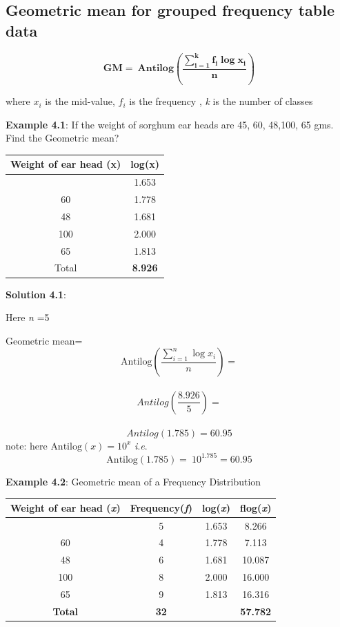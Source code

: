 \documentclass[
]{book}
\begin{document}
\hypertarget{geometric-mean-for-grouped-frequency-table-data}{%
\subsection{Geometric mean for grouped frequency table data}\label{geometric-mean-for-grouped-frequency-table-data}}

\[\mathbf{GM = \ Antilog}\left( \frac{\sum_{\mathbf{i = 1}}^{\mathbf{k}}{{\mathbf{f}_{\mathbf{i}}\mathbf{\log}}\mathbf{x}_{\mathbf{i}}}}{\mathbf{n}} \right)\]

where \(x_{i}\) is the mid-value, \(f_{i}\) is the frequency , \emph{k} is the
number of classes

\textbf{Example 4.1}: If the weight of sorghum ear heads are 45, 60, 48,100,
65 gms. Find the Geometric mean?

\begin{longtable}[]{@{}cc@{}}
\toprule\noalign{}
Weight of ear head (x) & log(x) \\
\midrule\noalign{}
\endhead
\bottomrule\noalign{}
\endlastfoot
45 & 1.653 \\
60 & 1.778 \\
48 & 1.681 \\
100 & 2.000 \\
65 & 1.813 \\
Total & \textbf{8.926} \\
\end{longtable}

\textbf{Solution 4.1}:

Here \emph{n} =5

Geometric mean=\\
\[\text{Antilog}\left( \frac{\sum_{i = 1}^{n}{\log x_{i}}}{n} \right) =\]\\
\[Antilog\left( \frac{8.926}{5} \right) =\]\\
\[ Antilog(1.785) = 60.95\] note: here
\(\text{Antilog}\left( x \right) = 10^{x}\) \emph{i}.\emph{e}.
\[\text{Antilog}\left( 1.785 \right) = \ 10^{1.785} = 60.95\]

\textbf{Example 4.2}: Geometric mean of a Frequency Distribution

\begin{longtable}[]{@{}cccc@{}}
\toprule\noalign{}
Weight of ear head (\emph{x}) & Frequency(\emph{f}) & log(\emph{x}) & flog(\emph{x}) \\
\midrule\noalign{}
\endhead
\bottomrule\noalign{}
\endlastfoot
45 & 5 & 1.653 & 8.266 \\
60 & 4 & 1.778 & 7.113 \\
48 & 6 & 1.681 & 10.087 \\
100 & 8 & 2.000 & 16.000 \\
65 & 9 & 1.813 & 16.316 \\
\textbf{Total} & \textbf{32} & & \textbf{57.782} \\
\end{longtable}
\end{document}
